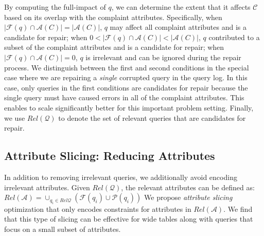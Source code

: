 By computing the full-impact of $q$, we can determine the extent that it affects $\mathcal{C}$
based on its overlap with the complaint attributes.
Specifically, 
when $|\mathcal{F}(q) \cap \mathcal{A}(C)|=|\mathcal{A}(C)|$, $q$ may affect all complaint attributes and is a candidate for repair; 
when $0 < |\mathcal{F}(q) \cap \mathcal{A}(C)| < |\mathcal{A}(C)|$, 
$q$ contributed to a subset of the complaint attributes and is a candidate for repair;
when $|\mathcal{F}(q) \cap \mathcal{A}(C)|=0$, $q$ is irrelevant 
and can be ignored during the repair process.
We distinguish between the first and second conditions in the special case where we are repairing a \emph{single} 
corrupted query in the query log.  In this case, only queries in the first conditions are candidates for repair because 
the single query must have caused errors in all of the complaint attributes.  This enables \sys to scale significantly better
for this important problem setting. 
Finally, we use $Rel\mathcal{(Q)}$ to denote the set of relevant
queries that are candidates for repair.


\subsection{Attribute Slicing: Reducing Attributes}\label{sec:opt:attslice}

In addition to removing irrelevant queries, we additionally avoid encoding irrelevant attributes.
Given $Rel\mathcal{(Q)}$, the relevant attributes can be defined as:
$Rel\mathcal{(A)} = \cup_{q_i \in Rel\mathcal{Q}} (\mathcal{F}(q_i)\cup \mathcal{P}(q_i))$
We propose \emph{attribute slicing} optimization that only encodes constraints for attributes in $Rel\mathcal{(A)}$.
We find that this type of slicing can be effective for wide tables along with queries that focus on a small subset of attributes.  



